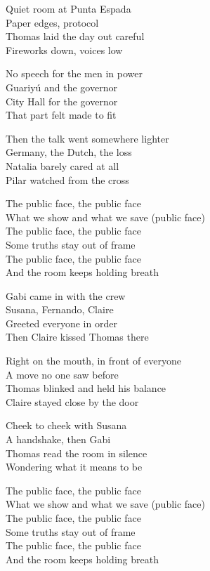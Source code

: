 \begin{lyrics}
Quiet room at Punta Espada\\
Paper edges, protocol\\
Thomas laid the day out careful\\
Fireworks down, voices low

No speech for the men in power\\
Guariyú and the governor\\
City Hall for the governor\\
That part felt made to fit

Then the talk went somewhere lighter\\
Germany, the Dutch, the loss\\
Natalia barely cared at all\\
Pilar watched from the cross

The public face, the public face\\
What we show and what we save (public face)\\
The public face, the public face\\
Some truths stay out of frame\\
The public face, the public face\\
And the room keeps holding breath

Gabi came in with the crew\\
Susana, Fernando, Claire\\
Greeted everyone in order\\
Then Claire kissed Thomas there

Right on the mouth, in front of everyone\\
A move no one saw before\\
Thomas blinked and held his balance\\
Claire stayed close by the door

Cheek to cheek with Susana\\
A handshake, then Gabi\\
Thomas read the room in silence\\
Wondering what it means to be

The public face, the public face\\
What we show and what we save (public face)\\
The public face, the public face\\
Some truths stay out of frame\\
The public face, the public face\\
And the room keeps holding breath


\end{lyrics}
